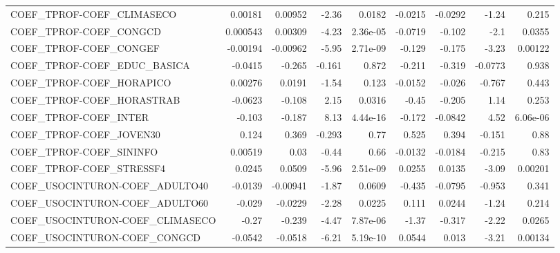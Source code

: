 \begin{tabular}{lrrrrrrrr}
COEF\_TPROF-COEF\_CLIMASECO             &     0.00181 &      0.00952 &   -2.36 &   0.0182 &    -0.0215 &     -0.0292 &        -1.24 &         0.215 \\
COEF\_TPROF-COEF\_CONGCD                &    0.000543 &      0.00309 &   -4.23 & 2.36e-05 &    -0.0719 &      -0.102 &         -2.1 &        0.0355 \\
COEF\_TPROF-COEF\_CONGEF                &    -0.00194 &     -0.00962 &   -5.95 & 2.71e-09 &     -0.129 &      -0.175 &        -3.23 &       0.00122 \\
COEF\_TPROF-COEF\_EDUC\_BASICA           &     -0.0415 &       -0.265 &  -0.161 &    0.872 &     -0.211 &      -0.319 &      -0.0773 &         0.938 \\
COEF\_TPROF-COEF\_HORAPICO              &     0.00276 &       0.0191 &   -1.54 &    0.123 &    -0.0152 &      -0.026 &       -0.767 &         0.443 \\
COEF\_TPROF-COEF\_HORASTRAB             &     -0.0623 &       -0.108 &    2.15 &   0.0316 &      -0.45 &      -0.205 &         1.14 &         0.253 \\
COEF\_TPROF-COEF\_INTER                 &      -0.103 &       -0.187 &    8.13 & 4.44e-16 &     -0.172 &     -0.0842 &         4.52 &      6.06e-06 \\
COEF\_TPROF-COEF\_JOVEN30               &       0.124 &        0.369 &  -0.293 &     0.77 &      0.525 &       0.394 &       -0.151 &          0.88 \\
COEF\_TPROF-COEF\_SININFO               &     0.00519 &         0.03 &   -0.44 &     0.66 &    -0.0132 &     -0.0184 &       -0.215 &          0.83 \\
COEF\_TPROF-COEF\_STRESSF4              &      0.0245 &       0.0509 &   -5.96 & 2.51e-09 &     0.0255 &      0.0135 &        -3.09 &       0.00201 \\
COEF\_USOCINTURON-COEF\_ADULTO40        &     -0.0139 &     -0.00941 &   -1.87 &   0.0609 &     -0.435 &     -0.0795 &       -0.953 &         0.341 \\
COEF\_USOCINTURON-COEF\_ADULTO60        &      -0.029 &      -0.0229 &   -2.28 &   0.0225 &      0.111 &      0.0244 &        -1.24 &         0.214 \\
COEF\_USOCINTURON-COEF\_CLIMASECO       &       -0.27 &       -0.239 &   -4.47 & 7.87e-06 &      -1.37 &      -0.317 &        -2.22 &        0.0265 \\
COEF\_USOCINTURON-COEF\_CONGCD          &     -0.0542 &      -0.0518 &   -6.21 & 5.19e-10 &     0.0544 &       0.013 &        -3.21 &       0.00134 \\

\end{tabular}
